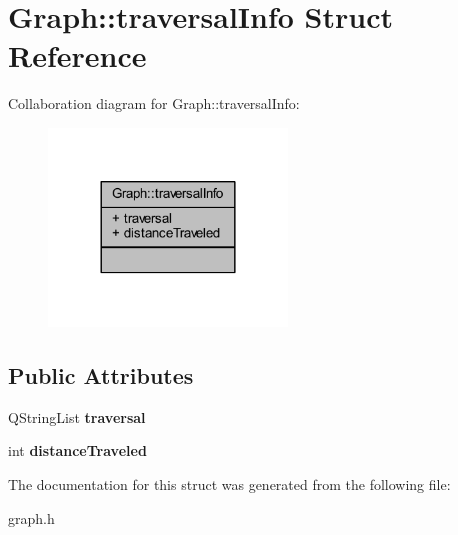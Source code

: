 \hypertarget{struct_graph_1_1traversal_info}{}\section{Graph\+:\+:traversal\+Info Struct Reference}
\label{struct_graph_1_1traversal_info}


Collaboration diagram for Graph\+:\+:traversal\+Info\+:\nopagebreak
\begin{figure}[H]
\begin{center}
\leavevmode
\includegraphics[width=180pt]{struct_graph_1_1traversal_info__coll__graph}
\end{center}
\end{figure}
\subsection*{Public Attributes}
\begin{DoxyCompactItemize}
\item 
\mbox{\label{struct_graph_1_1traversal_info_a6cc0cefaf64ee80392f52df1e3b98718}} 
Q\+String\+List {\bfseries traversal}
\item 
\mbox{\label{struct_graph_1_1traversal_info_aad37277396b6c83b5e1ea23d5052e098}} 
int {\bfseries distance\+Traveled}
\end{DoxyCompactItemize}


The documentation for this struct was generated from the following file\+:\begin{DoxyCompactItemize}
\item 
graph.\+h\end{DoxyCompactItemize}

